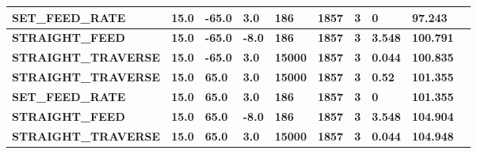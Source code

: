 \documentclass[aspectratio=169]{beamer}
\begin{document}
{\begin{frame}[fragile]
\begin{tabular}{|l|l|l|l|l|l|l|l|l|l|}
      \tiny{\bfseries{SET\_FEED\_RATE}} & 
      \tiny{\bfseries{15.0}} & 
      \tiny{\bfseries{-65.0}} & 
      \tiny{\bfseries{3.0}} & 
      \tiny{\bfseries{186}} & 
      \tiny{\bfseries{1857}} & 
      \tiny{\bfseries{3}} & 
      \tiny{\bfseries{0}} & 
      \tiny{\bfseries{97.243}} \\
      \hline

      \tiny{\bfseries{STRAIGHT\_FEED}} & 
      \tiny{\bfseries{15.0}} & 
      \tiny{\bfseries{-65.0}} & 
      \tiny{\bfseries{-8.0}} & 
      \tiny{\bfseries{186}} & 
      \tiny{\bfseries{1857}} & 
      \tiny{\bfseries{3}} & 
      \tiny{\bfseries{3.548}} & 
      \tiny{\bfseries{100.791}} \\
      \hline

      \tiny{\bfseries{STRAIGHT\_TRAVERSE}} & 
      \tiny{\bfseries{15.0}} & 
      \tiny{\bfseries{-65.0}} & 
      \tiny{\bfseries{3.0}} & 
      \tiny{\bfseries{15000}} & 
      \tiny{\bfseries{1857}} & 
      \tiny{\bfseries{3}} & 
      \tiny{\bfseries{0.044}} & 
      \tiny{\bfseries{100.835}} \\
      \hline

      \tiny{\bfseries{STRAIGHT\_TRAVERSE}} & 
      \tiny{\bfseries{15.0}} & 
      \tiny{\bfseries{65.0}} & 
      \tiny{\bfseries{3.0}} & 
      \tiny{\bfseries{15000}} & 
      \tiny{\bfseries{1857}} & 
      \tiny{\bfseries{3}} & 
      \tiny{\bfseries{0.52}} & 
      \tiny{\bfseries{101.355}} \\
      \hline    

      \tiny{\bfseries{SET\_FEED\_RATE}} & 
      \tiny{\bfseries{15.0}} & 
      \tiny{\bfseries{65.0}} & 
      \tiny{\bfseries{3.0}} & 
      \tiny{\bfseries{186}} & 
      \tiny{\bfseries{1857}} & 
      \tiny{\bfseries{3}} & 
      \tiny{\bfseries{0}} & 
      \tiny{\bfseries{101.355}} \\
      \hline

      \tiny{\bfseries{STRAIGHT\_FEED}} & 
      \tiny{\bfseries{15.0}} & 
      \tiny{\bfseries{65.0}} & 
      \tiny{\bfseries{-8.0}} & 
      \tiny{\bfseries{186}} & 
      \tiny{\bfseries{1857}} & 
      \tiny{\bfseries{3}} & 
      \tiny{\bfseries{3.548}} & 
      \tiny{\bfseries{104.904}} \\
      \hline

      \tiny{\bfseries{STRAIGHT\_TRAVERSE}} & 
      \tiny{\bfseries{15.0}} & 
      \tiny{\bfseries{65.0}} & 
      \tiny{\bfseries{3.0}} & 
      \tiny{\bfseries{15000}} & 
      \tiny{\bfseries{1857}} & 
      \tiny{\bfseries{3}} & 
      \tiny{\bfseries{0.044}} & 
      \tiny{\bfseries{104.948}} \\
      \hline


\end{tabular}
\end{frame}}
\end{document}
